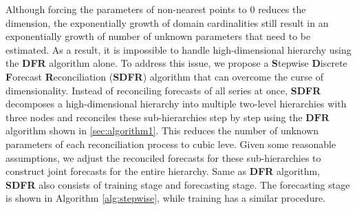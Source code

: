 \documentclass[a4paper,review,12pt,authoryear]{elsarticle}
\begin{document}
    Although forcing the parameters of non-nearest points to $0$ reduces the dimension, the exponentially growth of domain cardinalities  still result in an exponentially growth of  number of unknown parameters that need to be estimated.
    As a result, it is impossible to handle high-dimensional hierarchy using the \textbf{DFR} algorithm alone.
    To address this issue, we propose a \textbf{S}tepwise \textbf{D}iscrete \textbf{F}orecast \textbf{R}econciliation (\textbf{SDFR}) algorithm that can overcome the curse of dimensionality.
    Instead of reconciling forecasts of all series at once,  \textbf{SDFR}
    decomposes a high-dimensional hierarchy into multiple two-level hierarchies with three nodes and reconciles these sub-hierarchies step by step using the $\textbf{DFR}$ algorithm shown in \ref{sec:algorithm1}.
    This reduces the number of unknown parameters of each reconciliation process to cubic leve.
    Given some reasonable assumptions, we adjust the reconciled forecasts for these sub-hierarchies to construct joint forecasts for the entire hierarchy.
    Same as \textbf{DFR} algorithm, \textbf{SDFR} also consists of training stage and forecasting stage. The forecasting stage is shown in Algorithm \ref{alg:stepwise}, while training has a similar procedure.
\end{document}

